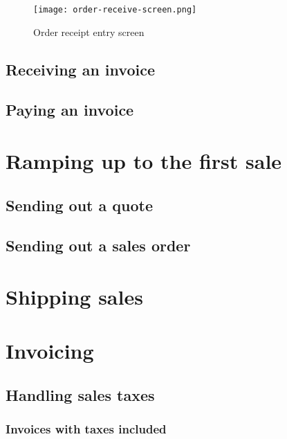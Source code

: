 \begin{figure}[h]
\centering
\texttt{[image: order-receive-screen.png]}
\caption{Order receipt entry screen}
\label{fig:order-receive-screen}
\end{figure}

\section{Receiving an invoice}
\label{sec-stock-invoice}

\section{Paying an invoice}
\label{sec-stock-payment}



\chapter{Ramping up to the first sale}
\label{cha-ramping-up-to-the-first-sale}

\section{Sending out a quote} 
\label{sec-sending-a-quote}

\section{Sending out a sales order}
\label{sec-sending-a-sales-order}



\chapter{Shipping sales}
\label{cha-shipping-sales}



\chapter{Invoicing}
\label{cha-starting-invoicing}

\section{Handling sales taxes}
\label{sec-invoicing-sales-tax}

\subsection{Invoices with taxes included}
\label{subsec-sales-tax-included}

